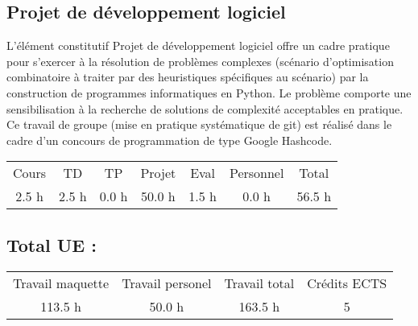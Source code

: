 \subsection{Projet de développement logiciel}%
\label{subsec:Projetdedveloppementlogiciel}%

%
L'élément constitutif Projet de développement logiciel offre un cadre pratique pour s’exercer à la résolution de problèmes complexes (scénario d'optimisation combinatoire à traiter par des heuristiques spécifiques au scénario) par la construction de programmes informatiques en Python. Le problème comporte une sensibilisation à la recherche de solutions de complexité acceptables en pratique. Ce travail de groupe (mise en pratique systématique de git) est réalisé dans le cadre d’un concours de programmation de type Google Hashcode.%
\begin{longtable}{c c c c c c c}%
\hline%
Cours&TD&TP&Projet&Eval&Personnel&Total\\%
2.5 h&2.5 h&0.0 h&50.0 h&1.5 h&0.0 h&56.5 h\\%
\hline%
\end{longtable}%
\subsection{Total UE :}%
\label{subsec:TotalUE}%

%
\begin{longtable}{c c c c}%
\hline%
Travail maquette&Travail personel&Travail total&Crédits ECTS\\%
113.5 h&50.0 h&163.5 h&5\\%
\hline%
\end{longtable}